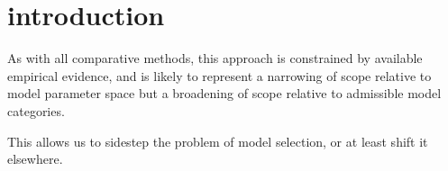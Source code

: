 \section{introduction}

As with all comparative methods, this approach is constrained by available empirical evidence, and is likely to represent a narrowing of scope relative to model parameter space but a broadening of scope relative to admissible model categories. 

This allows us to sidestep the problem of model selection, or at least shift it elsewhere. 
